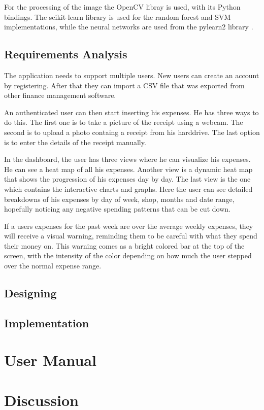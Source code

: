 For the processing of the image the OpenCV libray is used, with its Python bindings. The scikit-learn library \cite{pedregosa2011scikit} is used for the random forest and SVM implementations, while the neural networks are used from the pylearn2 library \cite{goodfellow2013pylearn2}. 
\subsection{Requirements Analysis}
The application needs to support multiple users. New users can create an account by registering. After that they can import a CSV file that was exported from other finance management software. 

An authenticated user can then start inserting his expenses. He has three ways to do this. The first one is to take a picture of the receipt using a webcam. The second is to upload a photo containg a receipt from his harddrive. The last option is to enter the details of the receipt manually. 

In the dashboard, the user has three views where he can visualize his expenses. He can see a heat map of all his expenses. Another view is a dynamic heat map that shows the progression of his expenses day by day. The last view is the one which contains the interactive charts and graphs. Here the user can see detailed breakdowns of his expenses by day of week, shop, months and date range, hopefully noticing any negative spending patterns that can be cut down. 

If a users expenses for the past week are over the average weekly expenses, they will receive a visual warning, reminding them to be careful with what they spend their money on. This warning comes as a bright colored bar at the top of the screen, with the intensity of the color depending on how much the user stepped over the normal expense range. 
\subsection{Designing}
\subsection{Implementation}
\section{User Manual}
\label{sec:manual}
\section{Discussion}